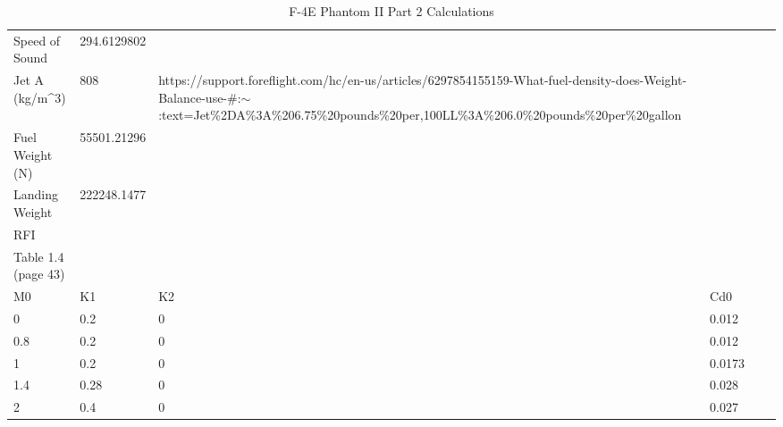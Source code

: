 \documentclass[12pt]{report}
\begin{document}
\begin{table}[H]
{\begin{tabular}{|lllll|l}
\multicolumn{1}{|l|}{Speed of Sound} &
  \multicolumn{1}{l|}{294.6129802} &
  \multicolumn{1}{l|}{} &
  \multicolumn{1}{l|}{} &
   &
   \\ \cline{1-5}
\multicolumn{1}{|l|}{Jet A (kg/m\textasciicircum{}3)} &
  \multicolumn{1}{l|}{808} &
  \multicolumn{1}{l|}{https://support.foreflight.com/hc/en-us/articles/6297854155159-What-fuel-density-does-Weight-Balance-use-\#:$\sim$:text=Jet\%2DA\%3A\%206.75\%20pounds\%20per,100LL\%3A\%206.0\%20pounds\%20per\%20gallon} &
  \multicolumn{1}{l|}{} &
   &
   \\ \cline{1-5}
\multicolumn{1}{|l|}{Fuel Weight (N)} &
  \multicolumn{1}{l|}{55501.21296} &
  \multicolumn{1}{l|}{} &
  \multicolumn{1}{l|}{} &
   &
   \\ \cline{1-5}
\multicolumn{1}{|l|}{Landing Weight} &
  \multicolumn{1}{l|}{222248.1477} &
  \multicolumn{1}{l|}{} &
  \multicolumn{1}{l|}{} &
   &
   \\ \cline{1-5}
\multicolumn{1}{|l|}{RFI} &
  \multicolumn{1}{l|}{} &
  \multicolumn{1}{l|}{} &
  \multicolumn{1}{l|}{} &
   &
   \\ \cline{1-5}
\multicolumn{1}{|l|}{Table 1.4 (page 43)} &
  \multicolumn{1}{l|}{} &
  \multicolumn{1}{l|}{} &
  \multicolumn{1}{l|}{} &
   &
   \\ \cline{1-5}
\multicolumn{1}{|l|}{M0} &
  \multicolumn{1}{l|}{K1} &
  \multicolumn{1}{l|}{K2} &
  \multicolumn{1}{l|}{Cd0} &
   &
   \\ \cline{1-5}
\multicolumn{1}{|l|}{0} &
  \multicolumn{1}{l|}{0.2} &
  \multicolumn{1}{l|}{0} &
  \multicolumn{1}{l|}{0.012} &
   &
   \\ \cline{1-5}
\multicolumn{1}{|l|}{0.8} &
  \multicolumn{1}{l|}{0.2} &
  \multicolumn{1}{l|}{0} &
  \multicolumn{1}{l|}{0.012} &
   &
   \\ \cline{1-5}
\multicolumn{1}{|l|}{1} &
  \multicolumn{1}{l|}{0.2} &
  \multicolumn{1}{l|}{0} &
  \multicolumn{1}{l|}{0.0173} &
   &
   \\ \cline{1-5}
\multicolumn{1}{|l|}{1.4} &
  \multicolumn{1}{l|}{0.28} &
  \multicolumn{1}{l|}{0} &
  \multicolumn{1}{l|}{0.028} &
   &
   \\ \cline{1-5}
\multicolumn{1}{|l|}{2} &
  \multicolumn{1}{l|}{0.4} &
  \multicolumn{1}{l|}{0} &
  \multicolumn{1}{l|}{0.027} &
   &
   \\ \cline{1-5}
\end{tabular}%
}
\caption{F-4E Phantom II Part 2 Calculations}
\label{tab:my-table}
\end{table}
\end{document}
